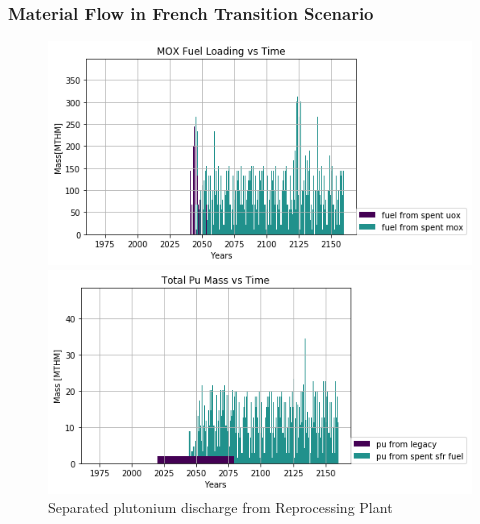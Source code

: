 \begin{frame}
	\frametitle{Material Flow in French Transition Scenario}
	
\begin{figure}[htbp!]
\begin{minipage}[b]{.45\linewidth}
	\begin{center}
		\includegraphics[width=\textwidth]{./images/french-transition/where_fuel.png}
	\end{center}
	\caption{Timeseries of fuel loaded into \glspl{SFR}}
	\label{fig:fuel}
\end{minipage}
\hspace{.5cm}
\begin{minipage}[b]{.45\linewidth}
	\centering
		\includegraphics[width=\linewidth]{./images/french-transition/pu.png}
	\caption{Separated plutonium discharge from Reprocessing Plant}
	\label{fig:pu_no_cum}
\end{minipage}
\end{figure}

\end{frame}
	
	